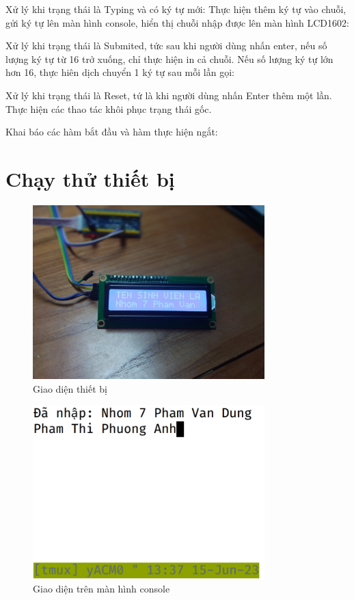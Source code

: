 Xử lý khi trạng thái là Typing và có ký tự mới: Thực hiện thêm ký tự vào chuỗi, gửi ký tự lên màn hình console, hiển thị chuỗi nhập được lên màn hình LCD1602:


Xử lý khi trạng thái là Submited, tức sau khi người dùng nhấn enter, nếu số lượng ký tự từ 16 trở xuống, chỉ thực hiện in cả chuỗi. Nếu số lượng ký tự lớn hơn 16, thực hiên dịch chuyển 1 ký tự sau mỗi lần gọi:


Xử lý khi trạng thái là Reset, tứ là khi người dùng nhấn Enter thêm một lần. Thực hiện các thao tác khôi phục trạng thái gốc.


Khai báo các hàm bắt đầu và hàm thực hiện ngắt:



\section{Chạy thử thiết bị}
\begin{figure}[H]
	\centering
	\includegraphics[width=0.8\textwidth]{images/demo-device.jpg}
	\caption{Giao diện thiết bị}
	\label{fig:demo-device}
\end{figure}
\begin{figure}[H]
	\centering
	\includegraphics[width=0.8\textwidth]{images/demo-computer.png}
	\caption{Giao diện trên màn hình console}
	\label{fig:demo-computer}
\end{figure}
